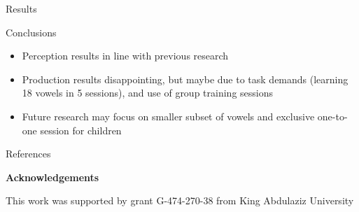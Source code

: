 \documentclass[final,xcolor={cmyk,hyperref}]{beamer}
\makeatletter
\def\tikzfigureref#1{\hskip0.125ex
\tikz[baseline=(@.base)]\node[figure label,
anchor=base, inner sep=0.333ex, font=\small\bfseries]{\csname tikzfigure@label@#1\endcsname};
}
\makeatother
\begin{document}
\begin{frame}[t]
\begin{columns}[t]
\begin{column}{0.525\linewidth}
\begin{block}{Results}
  \end{block}





\begin{block}{Conclusions}

\begin{itemize}
  \item Perception results in line with previous research \cite{alshangiti_2015,hattori_2009}

  \item Production results disappointing,
  but maybe due to task demands (learning 18 vowels in 5 sessions),
  and use of group training sessions

  \item
  Future research may focus on smaller subset of vowels
  and exclusive one-to-one session for children
\end{itemize}
\end{block}

\begin{block}{References}
  \renewcommand\bibfont{\tiny}
  \printbibliography
\end{block}

\textbf{Acknowledgements}

  This work was supported by
  grant G-474-270-38 from King Abdulaziz University

\end{column}

\end{columns}

\end{frame}
\end{document}
